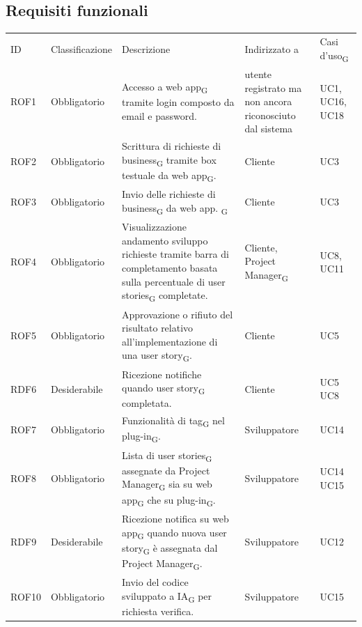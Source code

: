 \documentclass{article}
\begin{document}
\subsection{Requisiti funzionali}
\begin{center}
    \begin{tabular}{|p{2cm}|p{3cm}|p{6cm}|p{3cm}|p{2cm}|}
    \rowcolor{Blue} 
\hline
ID & Classificazione & Descrizione & Indirizzato a&Casi d'uso\textsubscript{G}  \\ 
\rowcolor{LightBlue}
\hline
ROF1&Obbligatorio & Accesso a web app\textsubscript{G} tramite login composto da email e password. & utente registrato ma non ancora riconosciuto dal sistema & UC1, UC16, UC18 \\ 
\rowcolor{LighterBlue}
\hline
ROF2&Obbligatorio & Scrittura di richieste di business\textsubscript{G} tramite box testuale da web app\textsubscript{G}. & Cliente & UC3\\ 
\rowcolor{LightBlue}
\hline
ROF3&Obbligatorio & Invio delle richieste di business\textsubscript{G} da web app. \textsubscript{G} & Cliente & UC3\\
\hline
\rowcolor{LighterBlue}

ROF4&Obbligatorio & Visualizzazione andamento sviluppo richieste tramite barra di completamento basata sulla percentuale di user stories\textsubscript{G} completate. & Cliente, Project Manager\textsubscript{G} & UC8, UC11\\
\rowcolor{LightBlue}
\hline
ROF5&Obbligatorio & Approvazione o rifiuto del risultato relativo all'implementazione di una user story\textsubscript{G}. & Cliente & UC5\\
\hline
\rowcolor{LighterBlue}

RDF6&Desiderabile & Ricezione notifiche quando user story\textsubscript{G} completata. & Cliente & UC5 UC8\\
\hline
\rowcolor{LightBlue}
\hline
ROF7&Obbligatorio & Funzionalità di tag\textsubscript{G} nel plug-in\textsubscript{G}.  & Sviluppatore & UC14\\
\hline
\rowcolor{LighterBlue}

ROF8&Obbligatorio & Lista di user stories\textsubscript{G} assegnate da Project Manager\textsubscript{G} sia su web app\textsubscript{G} che su plug-in\textsubscript{G}. & Sviluppatore & UC14 UC15\\
\hline
\rowcolor{LightBlue}

RDF9&Desiderabile & Ricezione notifica su web app\textsubscript{G} quando nuova user story\textsubscript{G} è assegnata dal Project Manager\textsubscript{G}.& Sviluppatore & UC12\\
\hline
\rowcolor{LighterBlue}
ROF10&Obbligatorio & Invio del codice sviluppato a IA\textsubscript{G} per richiesta verifica.& Sviluppatore & UC15\\


\end{tabular}
\end{center}
\end{document}
